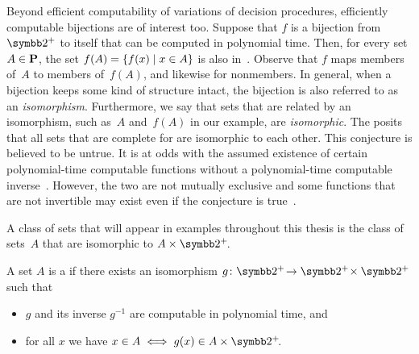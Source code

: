 Beyond efficient computability of variations of decision procedures, efficiently computable bijections are of interest too.
Suppose that $f$ is a bijection from~$\binary^+$ to itself that can be computed in polynomial time.
Then, for every set $A \in \textnormal{\textbf{P}}$, the set $f(A) = \{f(x) \;|\; x \in A\}$ is also in~.
Observe that $f$ maps members of~$A$ to members of~$f(A)$, and likewise for nonmembers.
In general, when a bijection keeps some kind of structure intact, the bijection is also referred to as an \emph{isomorphism}.
Furthermore, we say that sets that are related by an isomorphism, such as~$A$ and~$f(A)$ in our example, are \emph{isomorphic}.
The  \parencite{berman1977isomorphisms} posits that all sets that are complete for  are isomorphic to each other.
This conjecture is believed to be untrue.
It is at odds with the assumed existence of certain polynomial-time computable functions without a polynomial-time computable inverse~\parencite{young1983some,kurtz1989isomorphism}.
However, the two are not mutually exclusive and some functions that are not invertible may exist even if the conjecture is true~\parencite{hartmanis1991one,agrawal2009one}.

A class of sets that will appear in examples throughout this thesis is the class of sets~$A$ that are isomorphic to $A \times \binary^+\!$.
\begin{definition}
\label{def:p-cylinder}%
  A set $A$ is a  if there exists an isomorphism $g\colon \binary^+\! \to \binary^+\! \times \binary^+$ such that
  \begin{itemize}
    \item $g$ and its inverse $g^{-1}$ are computable in polynomial time, and
    \item for all $x$ we have $x \in A \iff g(x) \in A \times \binary^+\!$.
  \end{itemize}
\end{definition}

